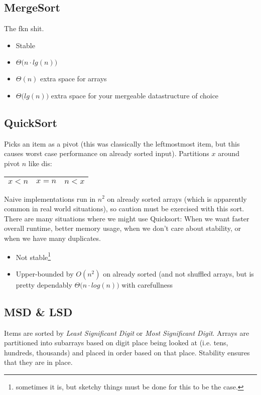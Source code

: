 \documentclass[12pt, letterpaper]{article}
\begin{document}
\subsection{MergeSort}
The fkn shit.
\begin{itemize}
\item Stable
\item $\Theta\big(n\cdot lg(n)\big)$
\item $\Theta (n)$ extra space for arrays
\item$\Theta\big(lg(n)\big)$ extra space for your mergeable datastructure of choice
\end{itemize}
\subsection{QuickSort}
Picks an item as a pivot (this was classically the leftmostmost item, but this causes worst case performance on already sorted input). Partitions $x$ around pivot $n$ like dis: 
\begin{tabular}{| c | c | c |}
\hline
$x < n$ & $x = n$ & $n<x$ \\
\hline
\end{tabular}
\newline \newline \noindent
Naive implementations run in $n^2$ on already sorted arrays (which is apparently common in real world situations), so caution must be exercised with this sort.
\newline \newline \noindent
There are many situations where we might use Quicksort: When we want faster overall runtime, better memory usage, when we don't care about stability, or when we have many duplicates.
\begin{itemize}
\item Not stable\footnote{sometimes it is, but sketchy things must be done for this to be the case.}
\item Upper-bounded by $O(n^2)$ on already sorted (and not shuffled arrays, but is pretty dependably $\Theta\big(n\cdot log(n)\big)$ with carefullness
\end{itemize}
\subsection{MSD \& LSD}
Items are sorted by \emph{Least Significant Digit} or \emph{Most Significant Digit}. Arrays are partitioned into subarrays based on digit place being looked at (i.e. tens, hundreds, thousands) and placed in order based on that place. Stability ensures that they are in place.
\newpage
\end{document}
